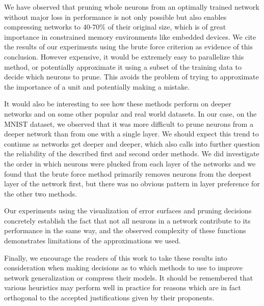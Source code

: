 We have observed that pruning whole neurons from an optimally trained network without major loss in performance is not only possible but also enables compressing networks to 40-70\% of their original size, which is of great importance in constrained memory environments like embedded devices. We cite the results of our experiments using the brute force criterion as evidence of this conclusion. However expensive, it would be extremely easy to parallelize this method, or potentially approximate it using a subset of the training data to decide which neurons to prune. This avoids the problem of trying to approximate the importance of a unit and potentially making a mistake. 

It would also be interesting to see how these methods perform on deeper networks and on some other popular and real world datasets. In our case, on the MNIST dataset, we observed that it was more difficult to prune neurons from a deeper network than from one with a single layer. We should expect this trend to continue as networks get deeper and deeper, which also calls into further question the reliability of the described first and second order methods. We did investigate the order in which neurons were plucked from each layer of the networks and we found that the brute force method primarily removes neurons from the deepest layer of the network first, but there was no obvious pattern in layer preference for the other two methods. 

Our experiments using the visualization of error surfaces and pruning decisions concretely establish the fact that not all neurons in a network contribute to its performance in the same way, and the observed complexity of these functions demonstrates limitations of the approximations we used. 

Finally, we encourage the readers of this work to take these results into consideration when making decisions as to which methods to use to improve network generalization or compress their models. It should be remembered that various heuristics may perform well in practice for reasons which are in fact orthogonal to the accepted justifications given by their proponents. 

